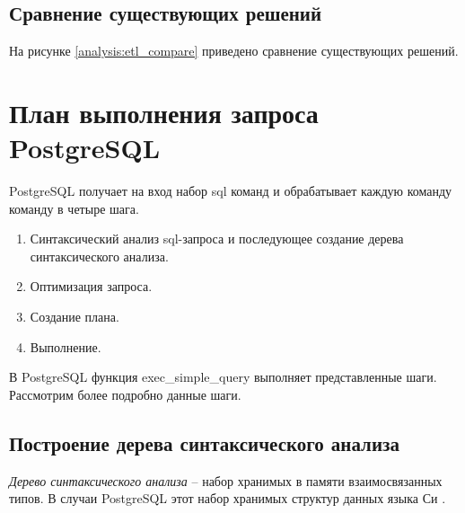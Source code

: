\newpage

\subsection{Сравнение существующих решений}

На рисунке \ref{analysis:etl_compare} приведено сравнение существующих решений.

\begin{figure}[ht!]
\end{figure}


\section{План выполнения запроса PostgreSQL}

PostgreSQL получает на вход набор sql команд и обрабатывает каждую команду команду в четыре шага.

\begin{enumerate}
	\item Синтаксический анализ sql-запроса и последующее создание дерева синтаксического анализа.
	\item Оптимизация запроса.
	\item Создание плана.
	\item Выполнение.
\end{enumerate}

В PostgreSQL функция exec\_simple\_query выполняет представленные шаги.
Рассмотрим более подробно данные шаги.

\subsection{Построение дерева синтаксического анализа}

\textit{Дерево синтаксического анализа} -- набор хранимых в памяти взаимосвязанных типов. 
В случаи PostgreSQL этот набор хранимых структур данных языка Си \cite{bib1}.

